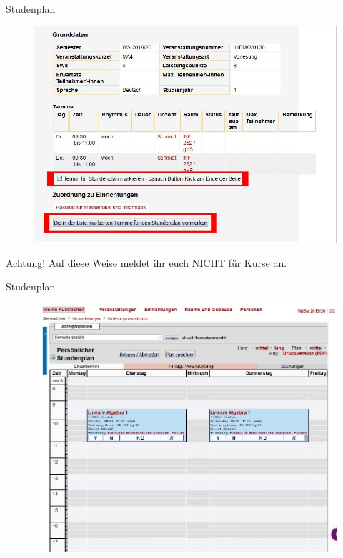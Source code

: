 \begin{frame}{Studenplan}
    \begin{figure}
        \centering
        \includegraphics[scale=0.3]{images/lsf14.jpg}
    \end{figure}
    Achtung! Auf diese Weise meldet ihr euch NICHT für Kurse an.
\end{frame}

\begin{frame}{Studenplan}
    \begin{figure}
        \centering
        \includegraphics[scale=0.25]{images/lsf15.jpg}
    \end{figure}
\end{frame}

